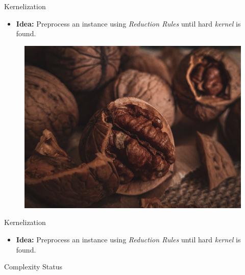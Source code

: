 \begin{frame}[c]{Kernelization}
\begin{itemize}
    \item \textbf{Idea: } Preprocess an instance using \textit{Reduction Rules} until hard \textit{kernel} is found.
\end{itemize}

\begin{figure}
\centering
\resizebox{0.35\textwidth}{!} {
\includegraphics{fig/pexels-yulia-ilina-10400351.jpg}
}
\end{figure}
\end{frame}


\begin{frame}[c]{Kernelization}



\begin{itemize}
    \item \textbf{Idea: } Preprocess an instance using \textit{Reduction Rules} until hard \textit{kernel} is found.
\end{itemize}

\begin{figure}
\centering
\resizebox{0.7\textwidth}{!}{
    
}
\end{figure}
\end{frame}


\begin{frame}[c]{Complexity Status}
 \begin{figure}
    \centering
    \resizebox{0.9\textwidth}{!}{
        
    }
\end{figure}
\end{frame}